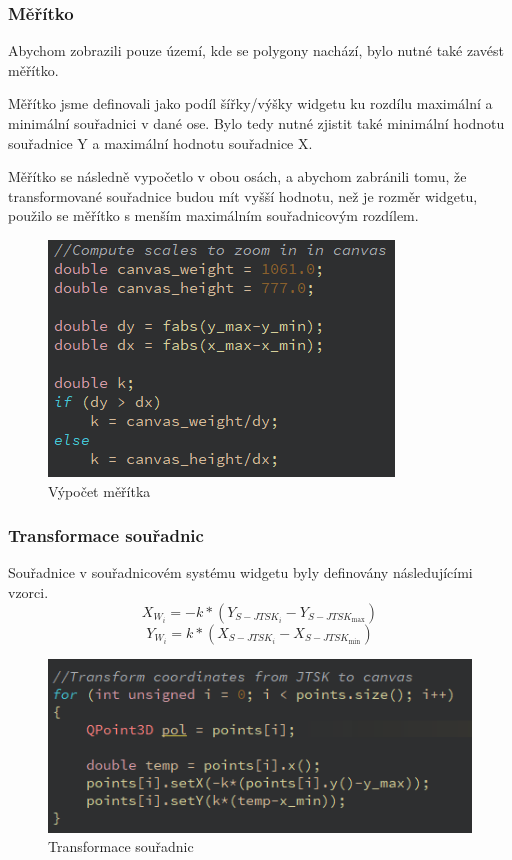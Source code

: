 \documentclass[11pt]{article}
\begin{document}
\subsubsection{Měřítko}
Abychom zobrazili pouze území, kde se polygony nachází, bylo nutné také zavést měřítko.
	
Měřítko jsme definovali jako podíl šířky/výšky widgetu ku rozdílu maximální a minimální souřadnici v dané ose. Bylo tedy nutné zjistit také minimální hodnotu souřadnice Y a maximální hodnotu souřadnice X.
	

Měřítko se následně vypočetlo v obou osách, a abychom zabránili tomu, že transformované souřadnice budou mít vyšší hodnotu, než je rozměr widgetu, použilo se měřítko s menším maximálním souřadnicovým rozdílem.
	
\begin{figure}[htbh]
	\centering
	\includegraphics[scale=0.8]{images/U2_problem_meritko2.png} 
	\caption{Výpočet měřítka}
	\label{fig:problem_scale2}
\end{figure} 
	
\subsubsection{Transformace souřadnic}
Souřadnice v souřadnicovém systému widgetu byly definovány následujícími vzorci.	
	$$X_{W_{i}}=-k *\left(Y_{S-J T S K_{i}}-Y_{S-J T S K_{\max }}\right)$$	
	$$ Y_{W_{i}}=k *\left(X_{S-J T S K_{i}}-X_{S-J T S K_{\min }}\right)$$
	
\begin{figure}[htbh]
	\centering
	\includegraphics[scale=1]{images/U2_problem_transformace.png} 
	\caption{Transformace souřadnic}
	\label{fig:problem_transformation}
\end{figure} 
\end{document}
